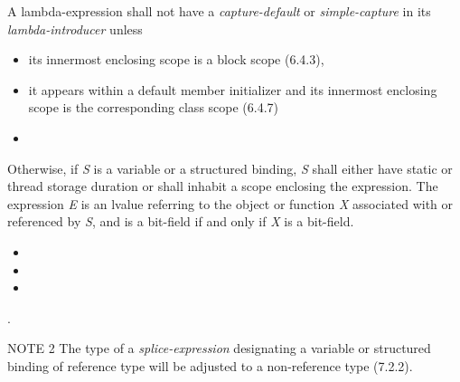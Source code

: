 \begin{modification}
A lambda-expression shall not have a \emph{capture-default} or
\emph{simple-capture} in its \emph{lambda-introducer} unless

\begin{itemize}[label=\textemdash]

\item
its innermost enclosing scope is a block scope (6.4.3), 

\item
it appears within a default member initializer and its innermost enclosing scope is the corresponding
class scope (6.4.7)

\item
{}

\end{itemize}

\end{modification}

\begin{modification}
Otherwise, if \emph{S} is a variable or a structured binding, \emph{S} shall either have static or thread storage duration
or shall inhabit a scope enclosing the expression. The expression \emph{E} is an lvalue referring to the object
or function \emph{X} associated with or referenced by \emph{S},  and is a
bit-field if and only if \emph{X} is a bit-field. 

\begin{itemize}[label=\textemdash]

\item
{}

\item
{}

\item
{}
\end{itemize}

.
\newline

NOTE 2 The type of a \emph{splice-expression} designating a variable or structured binding of reference type will be
adjusted to a non-reference type (7.2.2).

\end{modification}

